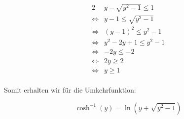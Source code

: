 \begin{alignat*}{2}
              & y - \sqrt{y^2-1} \le  1 \\
	\iff & y-1  \le   \sqrt{y^2-1} \\
	\iff & (y-1)^2  \le   y^2-1 \\
	\iff & y^2-2y+1  \le   y^2-1 \\
	\iff & -2y  \le   -2 \\
	\iff & 2y  \ge   2 \\
	\iff & y  \ge   1 \\
\end{alignat*}

Somit erhalten wir für die Umkehrfunktion:

$$
	\cosh^{-1}(y) = \ln(y + \sqrt{y^2-1})
$$